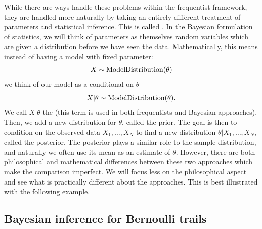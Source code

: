  While there are ways handle these problems within the frequentist framework, they are handled more naturally by taking an entirely different treatment of parameters and statistical inference. This is called . In the Bayesian formulation of statistics, we will think of parameters as themselves random variables which are given a distribution before we have seen the data. Mathematically, this means instead of having a model with fixed parameter: 
 \begin{equation}
X \sim {\rm ModelDistribution}(\theta)
 \end{equation}
 we think of our model as a conditional on $\theta$
  \begin{equation}
X|\theta \sim {\rm ModelDistribution}(\theta). 
 \end{equation}
We call $X|\theta$ the  (this term is used in both frequentists and Bayesian approaches). 
Then, we add a new distribution for $\theta$, called the prior. The goal is then to condition on the observed data $X_1,\dots,X_N$ to find a new distribution $\theta|X_1,\dots,X_N$, called the posterior. The posterior plays a similar role to the sample distribution, and naturally we often use its mean as an estimate of $\theta$. However, there are both philosophical and mathematical differences between these two approaches which make the comparison imperfect. We will focus less on the philosophical aspect and see what is practically different about the approaches. This is best illustrated with the following example. 
 
 

\subsection{Bayesian inference for Bernoulli trails}


